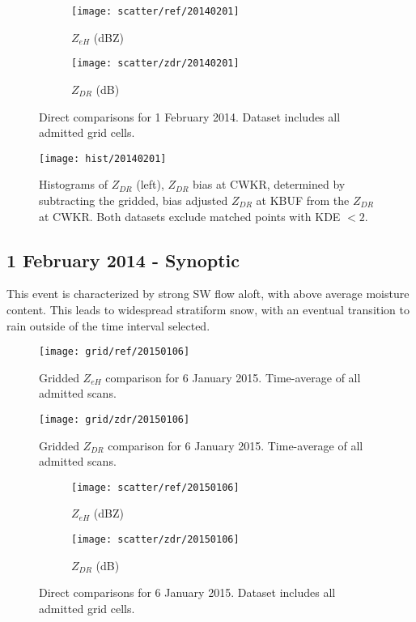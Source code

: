 \begin{figure}[p]
\centering
   \begin{subfigure}{0.49\linewidth} \centering
     \texttt{[image: scatter/ref/20140201]}
     \caption{$Z_{eH}$ (dBZ)}\label{fig:scatter_ref_20140201}
   \end{subfigure}
   \begin{subfigure}{0.49\linewidth} \centering
     \texttt{[image: scatter/zdr/20140201]}
     \caption{$Z_{DR}$ (dB)}\label{fig:scatter_zdr_20140201}
   \end{subfigure}
\caption{Direct comparisons for 1 February 2014. Dataset includes all admitted grid cells.} \label{fig:scatter_20140201}
\end{figure}

\begin{figure}[p]
\texttt{[image: hist/20140201]}\centering
\caption{Histograms of $Z_{DR}$ (left), $Z_{DR}$ bias at CWKR, determined by subtracting the gridded, bias adjusted $Z_{DR}$ at KBUF from the $Z_{DR}$ at CWKR. Both datasets exclude matched points with KDE $< 2$. } 
\label{fig:hist_20140201}
\end{figure}

\subsection{1 February 2014 - Synoptic}
This event is characterized by strong SW flow aloft, with above average moisture content. This leads to widespread stratiform snow, with an eventual transition to rain outside of the time interval selected.  

\begin{figure}[p]
\texttt{[image: grid/ref/20150106]}
\caption{Gridded $Z_{eH}$ comparison for 6 January 2015. Time-average of all admitted scans.} 
\label{fig:grid_ref_20150106}
\end{figure}

\begin{figure}[p]
\texttt{[image: grid/zdr/20150106]}
\caption{Gridded $Z_{DR}$ comparison for 6 January 2015. Time-average of all admitted scans.} 
\label{fig:grid_zdr_20150106}
\end{figure}

\begin{figure}[p]
\centering
   \begin{subfigure}{0.49\linewidth} \centering
     \texttt{[image: scatter/ref/20150106]}
     \caption{$Z_{eH}$ (dBZ)}\label{fig:scatter_ref_20150106}
   \end{subfigure}
   \begin{subfigure}{0.49\linewidth} \centering
     \texttt{[image: scatter/zdr/20150106]}
     \caption{$Z_{DR}$ (dB)}\label{fig:scatter_zdr_20150106}
   \end{subfigure}
\caption{Direct comparisons for 6 January 2015. Dataset includes all admitted grid cells.} \label{fig:scatter_20150106}
\end{figure}


